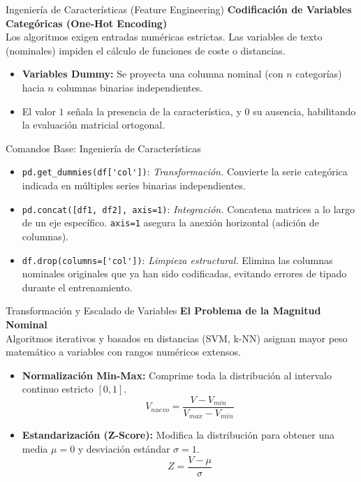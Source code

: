 \documentclass{beamer}
\begin{document}
\begin{frame}{Ingeniería de Características (Feature Engineering)}
    \textbf{Codificación de Variables Categóricas (One-Hot Encoding)}
    \vspace{0.3cm}
    \\
    Los algoritmos exigen entradas numéricas estrictas. Las variables de texto (nominales) impiden el cálculo de funciones de coste o distancias.
    \begin{itemize}
        \item \textbf{Variables Dummy:} Se proyecta una columna nominal (con $n$ categorías) hacia $n$ columnas binarias independientes.
        \item El valor $1$ señala la presencia de la característica, y $0$ su ausencia, habilitando la evaluación matricial ortogonal.
    \end{itemize}
\end{frame}

\begin{frame}[fragile]{Comandos Base: Ingeniería de Características}
    \begin{itemize}
        \item \verb|pd.get_dummies(df['col'])|: \textit{Transformación.} Convierte la serie categórica indicada en múltiples series binarias independientes.
        \item \verb|pd.concat([df1, df2], axis=1)|: \textit{Integración.} Concatena matrices a lo largo de un eje específico. \verb|axis=1| asegura la anexión horizontal (adición de columnas).
        \item \verb|df.drop(columns=['col'])|: \textit{Limpieza estructural.} Elimina las columnas nominales originales que ya han sido codificadas, evitando errores de tipado durante el entrenamiento.
    \end{itemize}
\end{frame}

\begin{frame}{Transformación y Escalado de Variables}
    \textbf{El Problema de la Magnitud Nominal}
    \vspace{0.2cm}
    \\
    Algoritmos iterativos y basados en distancias (SVM, k-NN) asignan mayor peso matemático a variables con rangos numéricos extensos.
    \vspace{0.3cm}
    \begin{itemize}
        \item \textbf{Normalización Min-Max:} Comprime toda la distribución al intervalo continuo estricto $[0, 1]$.
        \begin{equation*}
        V_{nuevo} = \frac{V - V_{min}}{V_{max} - V_{min}}
        \end{equation*}
        \item \textbf{Estandarización (Z-Score):} Modifica la distribución para obtener una media $\mu=0$ y desviación estándar $\sigma=1$.
        \begin{equation*}
        Z = \frac{V - \mu}{\sigma}
        \end{equation*}
    \end{itemize}
\end{frame}
\end{document}
